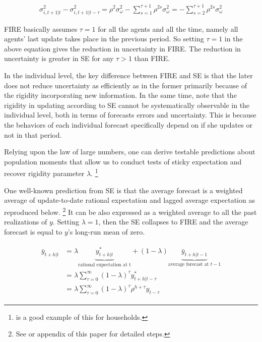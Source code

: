 \documentclass[12pt]{article}
\begin{document}
	\begin{eqnarray}
		\sigma^2_{i,t+1|t} - \sigma^2_{i,t+1|t-\tau} = \rho^{2} \sigma^2_{\omega} - \sum^{\tau+1}_{s=1}\rho^{2s} \sigma^2_{\omega} = -\sum^{\tau+1}_{s=2} \rho^{2s}\sigma^2_{\omega}
	\end{eqnarray}
	
	FIRE basically assumes  $\tau=1$ for all the agents and all the time, namely all agents' last update takes place in the previous period. So setting $\tau =1$ in the above equation gives the reduction in uncertainty in FIRE. The reduction in uncertainty is greater in SE for any $\tau>1$ than FIRE.
	
	In the individual level, the key difference between FIRE and SE is that the later does not reduce uncertainty as efficiently as in the former primarily because of the rigidity incorporating new information. In the same time, note that the rigidity in updating according to SE cannot be systematically observable in the individual level, both in terms of forecasts errors and uncertainty. This is because the behaviors of each individual forecast specifically depend on if she updates or not in that period. 
	
	Relying upon the law of large numbers, one can derive testable predictions about population moments that allow us to conduct tests of sticky expectation and recover rigidity parameter $\lambda$. \footnote{\citet{carroll2003macroeconomic} is a good example of this for households.} 
	
	One well-known prediction from SE is that the average forecast is a weighted average of update-to-date rational expectation and lagged average expectation as reproduced below. \footnote{See \citet{coibion2012can} or appendix of this paper for detailed steps.} It can be also expressed as a weighted average to all the past realizations of $y$. Setting $\lambda=1$, then the SE collapses to FIRE and the average forecast is equal to $y$'s long-run mean of zero.
	
	\begin{eqnarray}\label{MeanSEPop}
		\begin{aligned}
			\bar y_{t+h|t} & = \lambda \underbrace{y^*_{t+h|t}}_{\textrm{rational expectation at t}} + (1-\lambda) \underbrace{\bar y_{t+h|t-1}}_{\textrm{average forecast at } t-1} \\
			& = \lambda \sum^{\infty}_{\tau=0} (1-\lambda)^\tau y^*_{t+h|t-\tau} \\
			& = \lambda \sum^{\infty}_{\tau=0} (1-\lambda)^\tau \rho^{h+\tau}y_{t-\tau}
		\end{aligned}
	\end{eqnarray}
	
\end{document}
